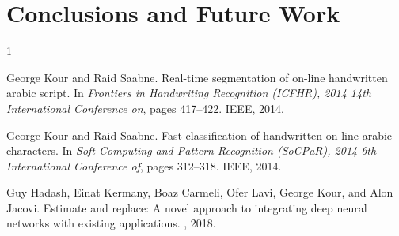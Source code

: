 \documentclass{article}
\begin{document}
\section{Conclusions and Future Work}

  


\begin{thebibliography}{1}

George Kour and Raid Saabne.
\newblock Real-time segmentation of on-line handwritten arabic script.
\newblock In {\em Frontiers in Handwriting Recognition (ICFHR), 2014 14th
  International Conference on}, pages 417--422. IEEE, 2014.

George Kour and Raid Saabne.
\newblock Fast classification of handwritten on-line arabic characters.
\newblock In {\em Soft Computing and Pattern Recognition (SoCPaR), 2014 6th
  International Conference of}, pages 312--318. IEEE, 2014.

Guy Hadash, Einat Kermany, Boaz Carmeli, Ofer Lavi, George Kour, and Alon
  Jacovi.
\newblock Estimate and replace: A novel approach to integrating deep neural
  networks with existing applications.
, 2018.

\end{thebibliography}
\end{document}
